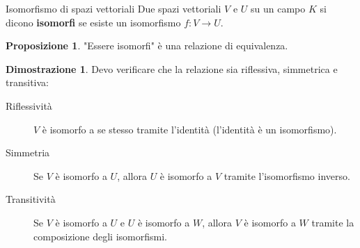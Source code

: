 \documentclass[a4paper]{article}
\theoremstyle{definition}
\newtheorem*{dimm}{Dimostrazione}
\newtheorem*{prop}{Proposizione}
\begin{document}
\begin{deff}{Isomorfismo di spazi vettoriali}{}
	Due spazi vettoriali $V$ e $U$ su un campo $K$ si dicono \textbf{isomorfi} se esiste un isomorfismo $f: V \rightarrow U$.
\end{deff}
\begin{prop}
	"Essere isomorfi" è una relazione di equivalenza.
\end{prop}
\begin{dimm}
	Devo verificare che la relazione sia riflessiva, simmetrica e transitiva:
	\begin{description}
		\item[Riflessività] $V$ è isomorfo a se stesso tramite l'identità (l'identità è un isomorfismo).
		\item[Simmetria] Se $V$ è isomorfo a $U$, allora $U$ è isomorfo a $V$ tramite l'isomorfismo inverso.
		\item[Transitività] Se $V$ è isomorfo a $U$ e $U$ è isomorfo a $W$, allora $V$ è isomorfo a $W$ tramite la composizione degli isomorfismi.
	\end{description}
\end{dimm}
\end{document}
